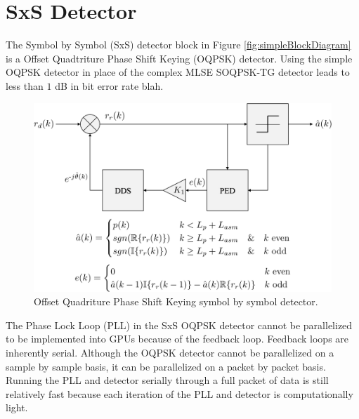 \section{SxS Detector}
\label{sec:oqpsk_detector}
The Symbol by Symbol (SxS) detector block in Figure \ref{fig:simpleBlockDiagram} is a Offset Quadtriture Phase Shift Keying (OQPSK) detector.
Using the simple OQPSK detector in place of the complex MLSE SOQPSK-TG detector leads to less than $1$ dB in bit error rate blah.
\begin{figure}
	\centering\includegraphics[width=6in]{figures/systemOverview/OQPSK.pdf}
	\caption{Offset Quadriture Phase Shift Keying symbol by symbol detector.}
	\label{fig:OQPSK}
\end{figure}

The Phase Lock Loop (PLL) in the SxS OQPSK detector cannot be parallelized to be implemented into GPUs because of the feedback loop. Feedback loops are inherently serial.
Although the OQPSK detector cannot be parallelized on a sample by sample basis, it can be parallelized on a packet by packet basis.
Running the PLL and detector serially through a full packet of data is still relatively fast because each iteration of the PLL and detector is computationally light.